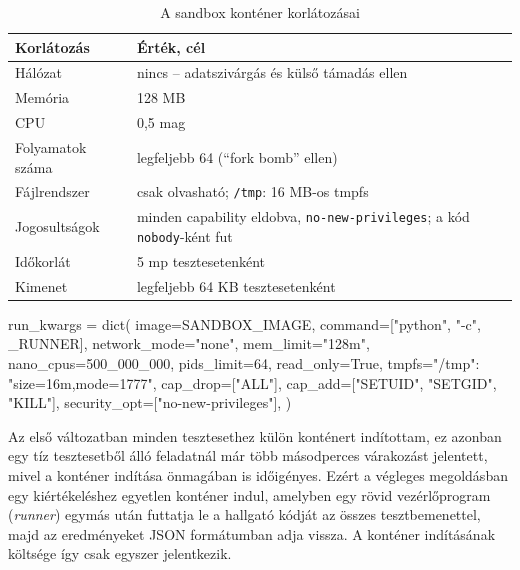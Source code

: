 \begin{table}[H]
  \centering
  \caption{A sandbox konténer korlátozásai}
  \label{tab:sandbox}
  \begin{tabularx}{\textwidth}{@{}lX@{}}
    \toprule
    Korlátozás & Érték, cél \\
    \midrule
    Hálózat             & nincs -- adatszivárgás és külső támadás ellen \\
    Memória             & 128 MB \\
    CPU                 & 0,5 mag \\
    Folyamatok száma    & legfeljebb 64 (\enquote{fork bomb} ellen) \\
    Fájlrendszer        & csak olvasható; \texttt{/tmp}: 16 MB-os tmpfs \\
    Jogosultságok       & minden capability eldobva, \texttt{no-new-privileges}; a kód \texttt{nobody}-ként fut \\
    Időkorlát           & 5 mp tesztesetenként \\
    Kimenet             & legfeljebb 64 KB tesztesetenként \\
    \bottomrule
  \end{tabularx}
\end{table}

\begin{python}[caption={A sandbox konténer indítási paraméterei (\texttt{sandbox.py}, részlet)},label=py:sandbox]
run_kwargs = dict(
    image=SANDBOX_IMAGE,
    command=["python", "-c", _RUNNER],
    network_mode="none",
    mem_limit="128m",
    nano_cpus=500_000_000,
    pids_limit=64,
    read_only=True,
    tmpfs={"/tmp": "size=16m,mode=1777"},
    cap_drop=["ALL"],
    cap_add=["SETUID", "SETGID", "KILL"],
    security_opt=["no-new-privileges"],
)
\end{python}

Az első változatban minden tesztesethez külön konténert indítottam, ez azonban egy tíz tesztesetből
álló feladatnál már több másodperces várakozást jelentett, mivel a konténer indítása önmagában is
időigényes. Ezért a végleges megoldásban egy kiértékeléshez egyetlen konténer indul, amelyben egy
rövid vezérlőprogram (\textit{runner}) egymás után futtatja le a hallgató kódját az összes
tesztbemenettel, majd az eredményeket JSON formátumban adja vissza. A konténer indításának
költsége így csak egyszer jelentkezik.

